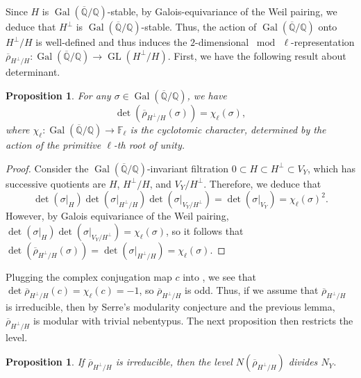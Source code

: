 \documentclass{amsproc}
\numberwithin{equation}{section}
\newtheorem{proposition}[equation]{Proposition}
\theoremstyle{definition}
\theoremstyle{remark}
\DeclareMathOperator{\GL}{GL}
\DeclareMathOperator{\Gal}{Gal}
\newcommand{\QQ}{\mathbb Q}
\newcommand{\FF}{\mathbb F}
\newcommand{\Qbar}{\overline{\QQ}}
\newcommand{\GalQ}{\Gal(\Qbar/\QQ)}
\newcommand{\rhoHperpH}{\overline\rho_{H^\perp\!/H}}
\begin{document}
Since $H$ is $\GalQ$-stable, by Galois-equivariance of the Weil pairing, we deduce that $H^\perp$ is $\GalQ$-stable. Thus, the action of $\GalQ$ onto $H^\perp/H$ is well-defined and thus induces the $2$-dimensional $\bmod\,\ell$-representation $\rhoHperpH : \GalQ \to \GL(H^\perp/H)$.
First, we have the following result about determinant.
\begin{proposition}
    \label{prop:det_Hperp_H}
    For any $\sigma\in\GalQ$, we have
    \begin{equation}
    \det(\rhoHperpH(\sigma)) = \chi_\ell(\sigma),
    \end{equation}
    where $\chi_\ell : \GalQ\to\FF_\ell$ is the cyclotomic character, determined by the action of the primitive $\ell$-th root of unity. 
\end{proposition}
\begin{proof}
    Consider the $\Gal(\Qbar/\QQ)$-invariant filtration
    $0 \subset H \subset H^\perp \subset V_Y$,
    which has successive quotients are $H$, $H^\perp/H$, and $V_Y/H^\perp$. Therefore, we deduce that
    \begin{equation}
    \det(\sigma|_H) \det(\sigma|_{H^\perp/H}) \det(\sigma|_{V_Y/H^\perp}) = \det(\sigma|_{V_Y}) = \chi_\ell(\sigma)^2.
    \end{equation}
    However, by Galois equivariance of the Weil pairing, $\det(\sigma|_H) \det(\sigma |_{V_Y/H^\perp}) = \chi_\ell(\sigma)$, so it follows that $\det(\rhoHperpH(\sigma)) = \det(\sigma|_{H^\perp/H}) = \chi_\ell(\sigma)$.
\end{proof}
Plugging the complex conjugation map $c$ into , we see that $\det \rhoHperpH(c) = \chi_\ell(c) = -1$, so $\rhoHperpH$ is odd.
Thus, if we assume that $\rhoHperpH$ is irreducible, then by Serre's modularity conjecture and the previous lemma,
$\rhoHperpH$ is modular with trivial nebentypus.
The next proposition then restricts the level.
\begin{proposition}
    If $\rhoHperpH$ is irreducible, then the level $N(\rhoHperpH)$ divides $N_Y$.
\end{proposition}
\end{document}
